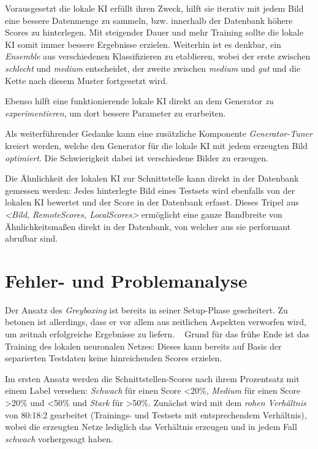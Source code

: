 Vorausgesetzt die lokale \ac{KI} erfüllt ihren Zweck, hilft sie iterativ mit jedem Bild eine bessere Datenmenge zu sammeln, bzw. innerhalb der Datenbank höhere Scores zu hinterlegen. Mit steigender Dauer und mehr Training sollte die lokale \ac{KI} somit immer bessere Ergebnisse erzielen. 
Weiterhin ist es denkbar, ein \textit{Ensemble} aus verschiedenen Klassifizieren zu etablieren, wobei der erste zwischen \textit{schlecht} und \textit{medium} entscheidet, der zweite zwischen \textit{medium} und \textit{gut} und die Kette nach diesem Muster fortgesetzt wird.
 
Ebenso hilft eine funktionierende lokale \ac{KI} direkt an dem Generator \textit{zu experimentieren}, um dort bessere Parameter zu erarbeiten. 
 
Als weiterführender Gedanke kann eine zusätzliche Komponente \textit{Generator-Tuner} kreiert werden, welche den Generator für die lokale \ac{KI} mit jedem erzeugten Bild \textit{optimiert}. Die Schwierigkeit dabei ist verschiedene Bilder zu erzeugen. 
 
Die Ähnlichkeit der lokalen \ac{KI} zur Schnittstelle kann direkt in der Datenbank gemessen werden: Jedes hinterlegte Bild eines Testsets wird ebenfalls von der lokalen \ac{KI} bewertet und der Score in der Datenbank erfasst. 
 Dieses Tripel aus \textit{<Bild, RemoteScores, LocalScores>} ermöglicht eine ganze Bandbreite von Ähnlichkeitsmaßen direkt in der Datenbank, von welcher aus sie performant abrufbar sind.  
\newpage
\section{Fehler- und Problemanalyse}
\label{sec:ProblemGreyBoxing}
Der Ansatz des \textit{Greyboxing} ist bereits in seiner Setup-Phase gescheitert. Zu betonen ist allerdings, dass er vor allem aus zeitlichen Aspekten verworfen wird, um zeitnah erfolgreiche Ergebnisse zu liefern.
~\newline
Grund für das frühe Ende ist das Training des lokalen neuronalen Netzes: Dieses kann bereits auf Basis der separierten Testdaten keine hinreichenden Scores erzielen. 

Im ersten Ansatz werden die Schnittstellen-Scores nach ihrem Prozentsatz mit einem Label versehen: \textit{Schwach} für einen Score <20\%, \textit{Medium} für einen Score >20\% und <50\% und \textit{Stark} für >50\%. Zunächst wird mit dem \textit{rohen Verhältnis} von 80:18:2 gearbeitet (Trainings- und Testsets mit entsprechendem Verhältnis), wobei die erzeugten Netze lediglich das Verhältnis erzeugen und in jedem Fall \textit{schwach} vorhergesagt haben. 

